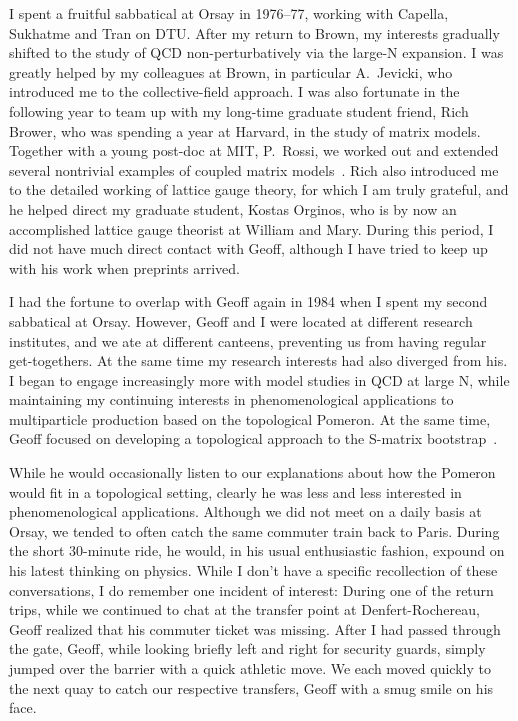 \documentclass[11pt, oneside]{article}   	%
\newcommand{\<}{\langle}
\renewcommand{\>}{\rangle}
\numberwithin{equation}{section}
\numberwithin{figure}{section}
\begin{document}
I spent a fruitful   sabbatical  at Orsay in 1976--77, working with Capella, Sukhatme and Tran on DTU.  After my return to Brown, my interests gradually shifted to the study of  QCD non-perturbatively via the large-N expansion. I was greatly helped by my colleagues at Brown, in particular A.~Jevicki, who introduced me to the collective-field approach. I was also fortunate in the following year to team up with  my long-time graduate student friend, Rich Brower, who was spending a year at Harvard,  in the study of matrix models.  Together with a young post-doc at MIT, P.~Rossi,  we worked out and extended several nontrivial examples of coupled matrix models~\cite{Brower:1980vm}. Rich also introduced me to the detailed working of lattice gauge theory, for which I am truly grateful, and he helped direct my graduate student, Kostas Orginos, who is by now an accomplished  lattice gauge theorist at William and Mary.  During this period, I did not have much direct contact with Geoff, although I have tried to keep up with his work when preprints arrived.

I  had the fortune to overlap with Geoff again in 1984 when I spent my second sabbatical at Orsay.  However, Geoff and I were located at different research institutes, and we ate at different canteens, preventing us from having regular get-togethers. At the same time my research interests  had also diverged from his. I began to engage increasingly more with model studies in QCD at large N, while maintaining my continuing interests in phenomenological applications to multiparticle production based on the topological Pomeron. At the same time, Geoff focused on developing a topological approach to the S-matrix bootstrap~\cite{Chew:1981hh}. 

While he would occasionally listen to our explanations about how the Pomeron would fit in a topological setting, clearly he was less and less interested in phenomenological applications. Although we did not meet on a daily basis at Orsay, we tended to often  catch the same commuter train back to Paris. During the short 30-minute ride, he would, in his usual enthusiastic fashion, expound on his latest thinking on physics. While I don't have a specific recollection of these conversations, I do remember one incident of interest: During one of the return trips, while we continued to chat at the transfer point at Denfert-Rochereau, Geoff realized that his commuter ticket was missing. After I had passed through the gate, Geoff, while looking briefly left and right for security guards, simply jumped over the barrier with a quick athletic move.  We each moved quickly to the next quay to catch our respective transfers, Geoff with a smug smile on his face.
\end{document}
